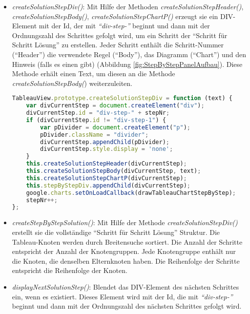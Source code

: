 \begin{itemize}
\begin{lstlisting}[language=JavaScript, caption= createSolutionStepChartP(Klasse TableauView), basicstyle=\scriptsize]
};
\end{lstlisting}
\item	\textit{\textit{createSolutionStepDiv()}}: Mit Hilfe der Methoden \textit{createSolutionStepHeader()}, \textit{createSolutionStepBody()},\textit{ createSolutionStepChartP()} erzeugt sie ein DIV-Element mit der Id, der mit \textit{``div-step-''} beginnt und dann mit der Ordnungszahl des Schrittes gefolgt wird, um ein Schritt der ``Schritt für Schritt Lösung'' zu erstellen. Jeder Schritt enthält die Schritt-Nummer (``Header'') die verwendete Regel (``Body''), das Diagramm (``Chart'') und den Hinweis (falls es einen gibt) (Abbildung \ref{fig:StepByStepPanelAufbau}). Diese Methode erhält einen Text, um diesen an die Methode \textit{createSolutionStepBody(}) weiterzuleiten.
\begin{lstlisting}[language=JavaScript, caption= createSolutionStepDiv(Klasse TableauView), basicstyle=\scriptsize] 
TableauView.prototype.createSolutionStepDiv = function (text) {
    var divCurrentStep = document.createElement("div");
    divCurrentStep.id = "div-step-" + stepNr;
    if (divCurrentStep.id != "div-step-1") {
        var pDivider = document.createElement("p");
        pDivider.className = "divider";
        divCurrentStep.appendChild(pDivider);
        divCurrentStep.style.display = 'none';
    }
    this.createSolutionStepHeader(divCurrentStep);
    this.createSolutionStepBody(divCurrentStep, text);
    this.createSolutionStepChartP(divCurrentStep);
    this.stepByStepDiv.appendChild(divCurrentStep);
    google.charts.setOnLoadCallback(drawTableauChartStepByStep);
    stepNr++;
};
\end{lstlisting}
\item	\textit{createStepByStepSolution()}: Mit Hilfe der Methode \textit{createSolutionStepDiv()} erstellt sie die vollständige ``Schritt für Schritt Lösung'' Struktur. Die Tableau-Knoten werden durch Breitensuche sortiert. Die Anzahl der Schritte entspricht der Anzahl der Knotengruppen. Jede Knotengruppe enthält nur die Knoten, die denselben Elternknoten haben. Die Reihenfolge der Schritte entspricht die Reihenfolge der Knoten.
\item	\textit{displayNextSolutionStep()}: Blendet das DIV-Element des nächsten Schrittes ein, wenn es existiert. Dieses Element wird mit der Id, die mit \textit{``div-step-''} beginnt und dann mit der Ordnungszahl des nächsten Schrittes gefolgt wird.
\begin{lstlisting}[language=JavaScript, caption= displayNextSolutionStep(Klasse TableauView), basicstyle=\scriptsize] 

\end{lstlisting}
\end{itemize}
